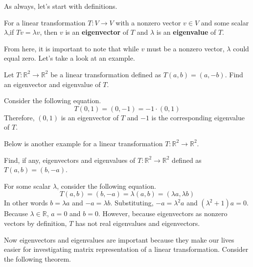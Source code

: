 \documentclass[../main.tex]{subfiles}
\begin{document}
As always, let's start with definitions.

\begin{definition}
For a linear transformation $T: V \to V$ with a nonzero vector
$v \in V$ and some scalar $\lambda$,if $Tv = \lambda v$, then
$v$ is an \textbf{eigenvector} of $T$ and $\lambda$ is an
\textbf{eigenvalue} of $T$.
\end{definition}

From here, it is important to note that while $v$ must be a
nonzero vector, $\lambda$ could equal zero. Let's take a look
at an example.

\begin{problem}
Let $T: \mathbb{R}^2 \to \mathbb{R}^2$ be a linear transformation
defined as $T(a, b) = (a, - b)$. Find an eigenvector and eigenvalue
of $T$.
\end{problem}
\begin{solution}
Consider the following equation.
\[
T(0, 1) = (0, -1) = -1 \cdot (0, 1)
\]
Therefore, $(0, 1)$ is an eigenvector of $T$ and $-1$ is the
corresponding eigenvalue of $T$.
\end{solution}

Below is another example for a linear transformation $T: \mathbb{R}^2
\to \mathbb{R}^2$.

\begin{problem}
Find, if any, eigenvectors and eigenvalues of $T: \mathbb{R}^2 \to
\mathbb{R}^2$ defined as $T(a, b) = (b, -a)$.
\end{problem}
\begin{solution}
For some scalar $\lambda$, consider the following equation.
\[
T(a, b) = (b, -a) = \lambda (a, b) = (\lambda a, \lambda b)
\]
In other words $b = \lambda a$ and $-a = \lambda b$. Substituting,
$-a = \lambda^2 a$ and $(\lambda^2 + 1) a = 0$. Because $\lambda \in
\mathbb{R}$, $a = 0$ and $b = 0$. However, because eigenvectors
as nonzero vectors by definition, $T$ has not real eigenvalues
and eigenvectors.
\end{solution}

Now eigenvectors and eigenvalues are important because they make
our lives easier for investigating matrix representation of a
linear transformation. Consider the following theorem.
\end{document}
